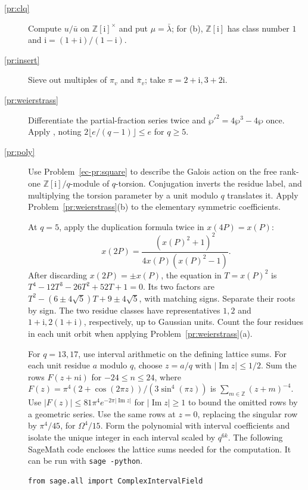 \documentclass[reqno]{amsart}
\theoremstyle{definition}
\theoremstyle{plain}
\theoremstyle{remark}
\newcommand{\Z}{\mathbb{Z}}
\newcommand{\ii}{\mathrm{i}}
\newcommand{\tl}[1]{\texttt{#1}}
\begin{document}
\begin{description}
\item[\ref{pr:clq}] Compute \(u/\bar u\) on \(\Z[\ii]^\times\) and put \(\mu = \bar\lambda\); for (b), \(\Z[\ii]\) has class number \(1\) and \(\ii = (1+\ii)/(1-\ii)\).
\item[\ref{pr:insert}] Sieve out multiples of \(\pi_v\) and \(\bar\pi_v\); take \(\pi = 2 + \ii, 3 + 2\ii\).
\item[\ref{pr:weierstrass}] Differentiate the partial-fraction series twice and \(\wp'^2 = 4\wp^3 - 4\wp\) once.  Apply \cite[Thm.~VII.3.4]{Si1}, noting \(2\lfloor e/(q-1)\rfloor \le e\) for \(q \ge 5\).
\item[\ref{pr:poly}] Use Problem~\ref{ec-pr:square} to describe the Galois action on the free rank-one \(\Z[\ii]/q\)-module of \(q\)-torsion.  Conjugation inverts the residue label, and multiplying the torsion parameter by a unit modulo \(q\) translates it.  Apply Problem~\ref{pr:weierstrass}\textup{(b)} to the elementary symmetric coefficients.

At \(q=5\), apply the duplication formula twice in \(x(4P)=x(P)\):
\[
  x(2P) = \frac{(x(P)^2+1)^2}{4x(P)(x(P)^2-1)} .
\]  After discarding \(x(2P)=\pm x(P)\), the equation in \(T=x(P)^2\) is \(T^4-12T^3-26T^2+52T+1=0\).  Its two factors are \(T^2-(6\pm4\sqrt5)T+9\pm4\sqrt5\), with matching signs.  Separate their roots by sign.  The two residue classes have representatives \(1,2\) and \(1+\ii,2(1+\ii)\), respectively, up to Gaussian units.  Count the four residues in each unit orbit when applying Problem~\ref{pr:weierstrass}\textup{(a)}.

For \(q=13,17\), use interval arithmetic on the defining lattice sums.  For each unit residue \(a\) modulo \(q\), choose \(z=a/q\) with \(\lvert\operatorname{Im} z\rvert\le 1/2\).  Sum the rows \(F(z+n\ii)\) for \(-24\le n\le24\), where \(F(z)=\pi^4(2+\cos(2\pi z))/(3\sin^4(\pi z))\) is \(\sum_{m\in\Z}(z+m)^{-4}\).  Use \(\lvert F(z)\rvert\le81\pi^4 e^{-2\pi\lvert\operatorname{Im}z\rvert}\) for \(\lvert\operatorname{Im}z\rvert\ge1\) to bound the omitted rows by a geometric series.  Use the same rows at \(z=0\), replacing the singular row by \(\pi^4/45\), for \(\Omega^4/15\).  Form the polynomial with interval coefficients and isolate the unique integer in each interval scaled by \(q^{6k}\).
The following SageMath code \cite{Sage} encloses the lattice sums needed for the computation.  It can be run with \tl{sage -python}.
\begingroup
\small
\begin{verbatim}
from sage.all import ComplexIntervalField


\end{verbatim}
\end{description}
\end{document}
